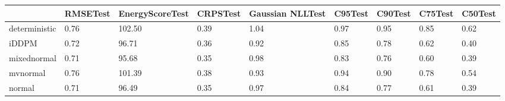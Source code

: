 \begin{tabular}{lllllllll}
\toprule
 & RMSETest & EnergyScoreTest & CRPSTest & Gaussian NLLTest & C95Test & C90Test & C75Test & C50Test \\
\midrule
deterministic & 0.76 & 102.50 & 0.39 & 1.04 & 0.97 & 0.95 & 0.85 & 0.62 \\
iDDPM & 0.72 & 96.71 & 0.36 & 0.92 & 0.85 & 0.78 & 0.62 & 0.40 \\
mixednormal & 0.71 & 95.68 & 0.35 & 0.98 & 0.83 & 0.76 & 0.60 & 0.39 \\
mvnormal & 0.76 & 101.39 & 0.38 & 0.93 & 0.94 & 0.90 & 0.78 & 0.54 \\
normal & 0.71 & 96.49 & 0.35 & 0.97 & 0.84 & 0.77 & 0.61 & 0.39 \\
\bottomrule
\end{tabular}
